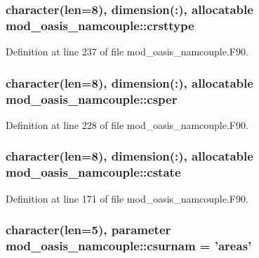 \hypertarget{classmod__oasis__namcouple_a7cbf27327f01748c4f87803ccff71b61}{
\subsubsection[{crsttype}]{\setlength{\rightskip}{0pt plus 5cm}character(len=8), dimension(\+:), allocatable mod\+\_\+oasis\+\_\+namcouple\+::crsttype\hspace{0.3cm}{\ttfamily [private]}}}\label{classmod__oasis__namcouple_a7cbf27327f01748c4f87803ccff71b61}


Definition at line 237 of file mod\+\_\+oasis\+\_\+namcouple.\+F90.

\hypertarget{classmod__oasis__namcouple_a348612422a03e478041ca5bdfd7201ae}{
\subsubsection[{csper}]{\setlength{\rightskip}{0pt plus 5cm}character(len=8), dimension(\+:), allocatable mod\+\_\+oasis\+\_\+namcouple\+::csper\hspace{0.3cm}{\ttfamily [private]}}}\label{classmod__oasis__namcouple_a348612422a03e478041ca5bdfd7201ae}


Definition at line 228 of file mod\+\_\+oasis\+\_\+namcouple.\+F90.

\hypertarget{classmod__oasis__namcouple_a4b507ab44ad62713c9e3d83ded6be3f4}{
\subsubsection[{cstate}]{\setlength{\rightskip}{0pt plus 5cm}character(len=8), dimension(\+:), allocatable mod\+\_\+oasis\+\_\+namcouple\+::cstate\hspace{0.3cm}{\ttfamily [private]}}}\label{classmod__oasis__namcouple_a4b507ab44ad62713c9e3d83ded6be3f4}


Definition at line 171 of file mod\+\_\+oasis\+\_\+namcouple.\+F90.

\hypertarget{classmod__oasis__namcouple_a49e79935fc2421fe3e4e7422f17b34ea}{
\subsubsection[{csurnam}]{\setlength{\rightskip}{0pt plus 5cm}character(len=5), parameter mod\+\_\+oasis\+\_\+namcouple\+::csurnam = 'areas'\hspace{0.3cm}{\ttfamily [private]}}}\label{classmod__oasis__namcouple_a49e79935fc2421fe3e4e7422f17b34ea}


